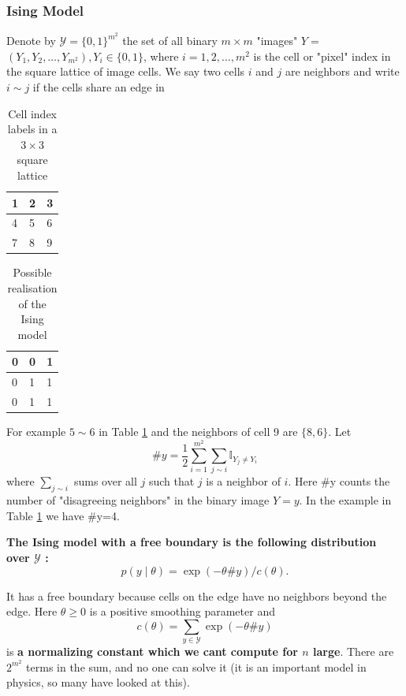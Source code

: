 \documentclass{article}
\begin{document}
\subsubsection{Ising Model}
Denote by $\mathcal{Y}=\{0,1\}^{m^2}$ the set of all binary $m \times m$ "images" $Y=$ $\left(Y_1, Y_2, \ldots, Y_{m^2}\right), Y_i \in\{0,1\}$, where $i=1,2, \ldots, m^2$ is the cell or "pixel" index in the square lattice of image cells. We say two cells $i$ and $j$ are neighbors and write $i \sim j$ if the cells share an edge in
\begin{table}[]
    \centering
    \begin{tabular}{|l|l|l|}
\hline 1 & 2 & 3 \\
\hline 4 & 5 & 6 \\
\hline 7 & 8 & 9 \\
\hline

\end{tabular}
    \caption{Cell index labels in a $3 \times 3$ square lattice}
    \label{tab:ising-1}
\end{table}



\begin{table}
    \centering
\begin{tabular}{|l|l|l|}
\hline 0 & 0 & 1 \\
\hline 0 & 1 & 1 \\
\hline 0 & 1 & 1 \\
\hline
\end{tabular}
    \caption{Possible realisation of the Ising model}
    \label{tab:ising-2}
\end{table}


 For example $5 \sim 6$ in Table \ref{tab:ising-1} and the neighbors of cell 9 are $\{8,6\}$. Let
$$
\# y=\frac{1}{2} \sum_{i=1}^{m^2} \sum_{j \sim i} \mathbb{I}_{Y_j \neq Y_i}
$$
where $\sum_{j \sim i}$ sums over all $j$ such that $j$ is a neighbor of $i$. Here \#y counts the number of "disagreeing neighbors" in the binary image $Y=y$. In the example in Table \ref{tab:ising-1} we have \#y=4.

\textbf{The Ising model with a free boundary is the following distribution over $\mathcal{Y}$ :}
$$
p(y \mid \theta)=\exp (-\theta \# y) / c(\theta) .
$$

It has a free boundary because cells on the edge have no neighbors beyond the edge. Here $\theta \geq 0$ is a positive smoothing parameter and
$$
c(\theta)=\sum_{y \in \mathcal{Y}} \exp (-\theta \# y)
$$
is \textbf{a normalizing constant which we cant compute for $n$ large}. There are $2^{m^2}$ terms in the sum, and no one can solve it (it is an important model in physics, so many have looked at this).
\end{document}
